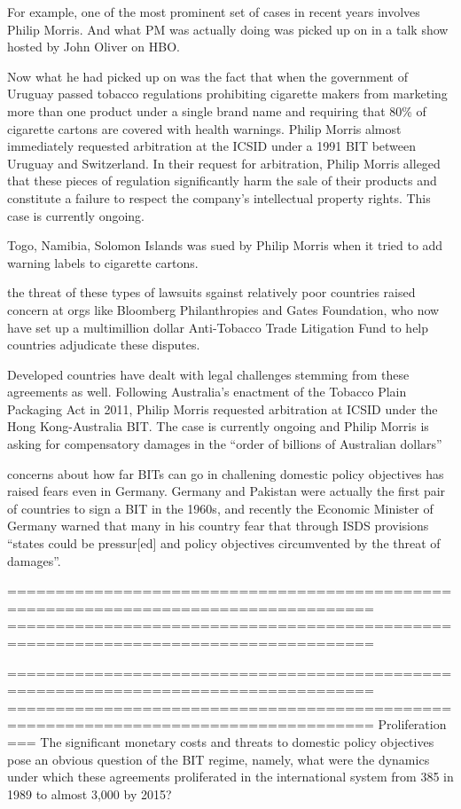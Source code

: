 For example, one of the most prominent set of cases in recent years involves Philip Morris. And what PM was actually doing was picked up on in a talk show hosted by John Oliver on HBO. 

Now what he had picked up on was the fact that when the government of Uruguay passed tobacco regulations prohibiting cigarette makers from marketing more than one product under a single brand name and requiring that 80\% of cigarette cartons are covered with health warnings. Philip Morris almost immediately requested arbitration at the ICSID under a 1991 BIT between Uruguay and Switzerland. In their request for arbitration, Philip Morris alleged that these pieces of regulation significantly harm the sale of their products and constitute a failure to respect the company’s intellectual property rights. This case is currently ongoing. 

Togo, Namibia, Solomon Islands was sued by Philip Morris when it tried to add warning labels to cigarette cartons.

the threat of these types of lawsuits sgainst relatively poor countries raised concern at orgs like Bloomberg Philanthropies and Gates Foundation, who now have set up a multimillion dollar  Anti-Tobacco Trade Litigation Fund to help countries adjudicate these disputes.

Developed countries have dealt with legal challenges stemming from these agreements as well. Following Australia’s enactment of the Tobacco Plain Packaging Act in 2011, Philip Morris requested arbitration at ICSID under the Hong Kong-Australia BIT. The case is currently ongoing and Philip Morris is asking for compensatory damages in the “order of billions of Australian dollars” 

concerns about how far BITs can go in challening domestic policy objectives has raised fears even in Germany. Germany and Pakistan were actually the first pair of countries to sign a BIT in the 1960s, and recently the Economic Minister of Germany warned that many in his country fear that through ISDS provisions “states could be pressur[ed] and policy objectives circumvented by the threat of damages”.

====================================================================================
====================================================================================

====================================================================================
====================================================================================
Proliferation
===
The significant monetary costs and threats to domestic policy objectives pose an obvious question of the BIT regime, namely, what were the dynamics under which these agreements proliferated in the international system from 385 in 1989 to almost 3,000 by 2015?

